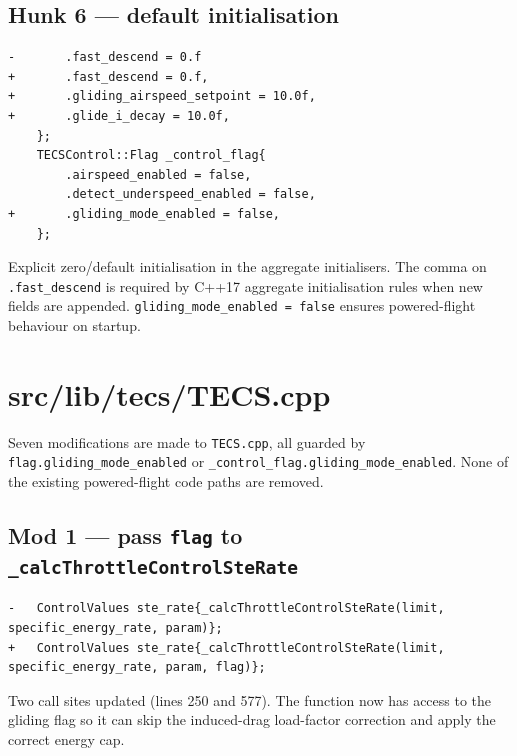 \documentclass[12pt,a4paper]{article}
\begin{document}
\subsection{Hunk 6 — default initialisation}

\begin{lstlisting}[style=diff]
-		.fast_descend = 0.f
+		.fast_descend = 0.f,
+		.gliding_airspeed_setpoint = 10.0f,
+		.glide_i_decay = 10.0f,
	};
	TECSControl::Flag _control_flag{
		.airspeed_enabled = false,
		.detect_underspeed_enabled = false,
+		.gliding_mode_enabled = false,
	};
\end{lstlisting}
\begin{annotation}Explicit zero/default initialisation in the aggregate initialisers. The comma on \texttt{.fast\_descend} is required by C++17 aggregate initialisation rules when new fields are appended. \texttt{gliding\_mode\_enabled = false} ensures powered-flight behaviour on startup.\end{annotation}

\section{src/lib/tecs/TECS.cpp}

\begin{annotation}
Seven modifications are made to \texttt{TECS.cpp}, all guarded by \texttt{flag.gliding\_mode\_enabled} or \texttt{\_control\_flag.gliding\_mode\_enabled}. None of the existing powered-flight code paths are removed.
\end{annotation}

\subsection{Mod 1 — pass \texttt{flag} to \texttt{\_calcThrottleControlSteRate}}

\begin{lstlisting}[style=diff]
-	ControlValues ste_rate{_calcThrottleControlSteRate(limit, specific_energy_rate, param)};
+	ControlValues ste_rate{_calcThrottleControlSteRate(limit, specific_energy_rate, param, flag)};
\end{lstlisting}
\begin{annotation}Two call sites updated (lines 250 and 577). The function now has access to the gliding flag so it can skip the induced-drag load-factor correction and apply the correct energy cap.\end{annotation}
\end{document}
